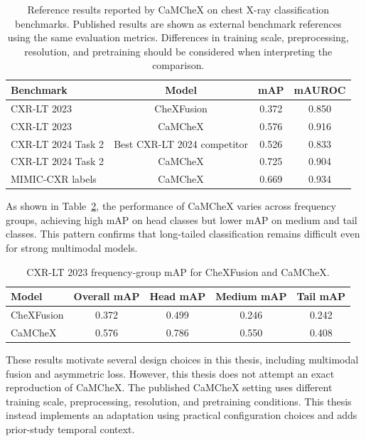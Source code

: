 \begin{table}[H]
    \centering
    \caption[Reference results reported by CaMCheX on classification benchmarks]{Reference results reported by CaMCheX on chest X-ray classification benchmarks. Published results are shown as external benchmark references using the same evaluation metrics. Differences in training scale, preprocessing, resolution, and pretraining should be considered when interpreting the comparison.}
    \label{tab:camchex_reference_results}
    \begin{tabular}{lccc}
        \hline
        Benchmark & Model & mAP & mAUROC \\
        \hline
        CXR-LT 2023 & CheXFusion & 0.372 & 0.850 \\
        CXR-LT 2023 & CaMCheX & 0.576 & 0.916 \\
        CXR-LT 2024 Task 2 & Best CXR-LT 2024 competitor & 0.526 & 0.833 \\
        CXR-LT 2024 Task 2 & CaMCheX & 0.725 & 0.904 \\
        MIMIC-CXR labels & CaMCheX & 0.669 & 0.934 \\
        \hline
    \end{tabular}
\end{table}

As shown in Table~\ref{tab:camchex_longtail_results}, the performance of CaMCheX varies across frequency groups, achieving high mAP on head classes but lower mAP on medium and tail classes. This pattern confirms that long-tailed classification remains difficult even for strong multimodal models.

\begin{table}[H]
    \centering
    \caption{CXR-LT 2023 frequency-group mAP for CheXFusion and CaMCheX.}
    \label{tab:camchex_longtail_results}
    \begin{tabular}{lcccc}
        \hline
        Model & Overall mAP & Head mAP & Medium mAP & Tail mAP \\
        \hline
        CheXFusion & 0.372 & 0.499 & 0.246 & 0.242 \\
        CaMCheX & 0.576 & 0.786 & 0.550 & 0.408 \\
        \hline
    \end{tabular}
\end{table}

These results motivate several design choices in this thesis, including multimodal fusion and asymmetric loss. However, this thesis does not attempt an exact reproduction of CaMCheX. The published CaMCheX setting uses different training scale, preprocessing, resolution, and pretraining conditions. This thesis instead implements an adaptation using practical configuration choices and adds prior-study temporal context.

